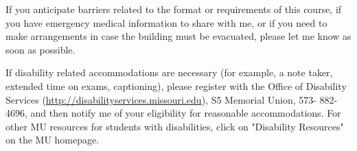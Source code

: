 \documentclass[11pt]{article}
\begin{document}
If you anticipate barriers related to the format or requirements of this course, if you have emergency medical information to share with me, or if you need to make arrangements in case the building must be evacuated, please let me know as soon as possible.

If disability related accommodations are necessary (for example, a note taker, extended time on exams, captioning), please register with the Office of Disability Services (\url{http://disabilityservices.missouri.edu}), S5 Memorial Union, 573- 882-4696, and then notify me of your eligibility for reasonable accommodations.  For other MU resources for students with disabilities, click on "Disability Resources" on the MU homepage.
\end{document}
